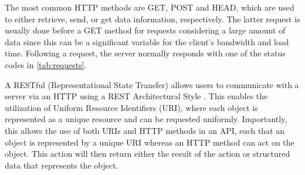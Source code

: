 \begin{table}[!ht]
\centering
\caption{Numeric status code for response. The leftmost digit decides the type of response, while the two follow-up digits depend on the implemented API.}
\label{tab:requests}
\noindent{}
\end{table}

The most common HTTP methods are GET, POST and HEAD, which are used to either retrieve, send, or get data information, respectively. The latter request is usually done before a GET method for requests considering a large amount of data since this can be a significant variable for the client's bandwidth and load time. Following a request, the server normally responds with one of the status codes in \autoref{tab:requests}.



A RESTful (Representational State Transfer) allows users to communicate with a server via an HTTP using a REST Architectural Style \cite{Battle2008}. This enables the utilization of Uniform Resource Identifiers (URI), where each object is represented as a unique resource and can be requested uniformly. Importantly, this allows the use of both URIs and HTTP methods in an API, such that an object is represented by a unique URI whereas an HTTP method can act on the object. This action will then return either the result of the action or structured data that represents the object.



